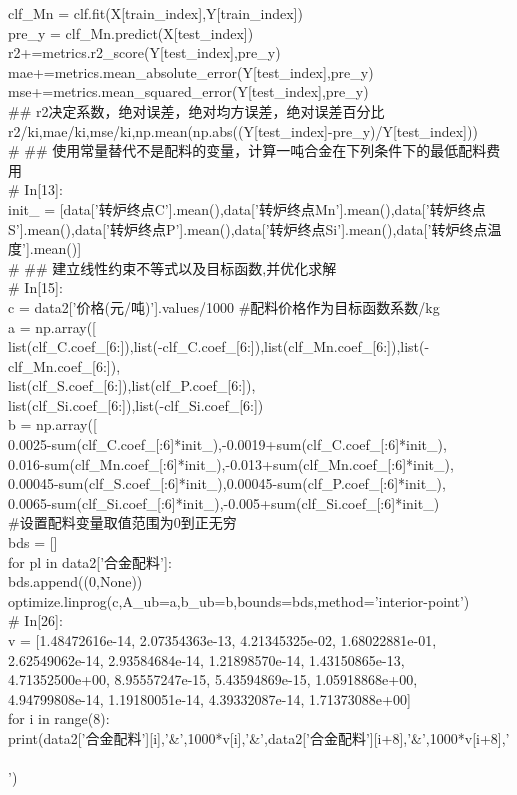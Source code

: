 \documentclass{xcumcmart}
\begin{document}
clf\_Mn = clf.fit(X[train\_index],Y[train\_index]) \\
pre\_y = clf\_Mn.predict(X[test\_index]) \\
r2+=metrics.r2\_score(Y[test\_index],pre\_y) \\
mae+=metrics.mean\_absolute\_error(Y[test\_index],pre\_y) \\
mse+=metrics.mean\_squared\_error(Y[test\_index],pre\_y) \\
\#\# r2决定系数，绝对误差，绝对均方误差，绝对误差百分比 \\
r2/ki,mae/ki,mse/ki,np.mean(np.abs((Y[test\_index]-pre\_y)/Y[test\_index])) \\
\# \#\# 使用常量替代不是配料的变量，计算一吨合金在下列条件下的最低配料费用 \\
\# In[13]: \\
init\_ = [data['转炉终点C'].mean(),data['转炉终点Mn'].mean(),data['转炉终点S'].mean(),data['转炉终点P'].mean(),data['转炉终点Si'].mean(),data['转炉终点温度'].mean()] \\
\# \#\# 建立线性约束不等式以及目标函数,并优化求解 \\
\# In[15]: \\
c = data2['价格(元/吨)'].values/1000 \#配料价格作为目标函数系数/kg \\
a = np.array([ \\
list(clf\_C.coef\_[6:]),list(-clf\_C.coef\_[6:]),list(clf\_Mn.coef\_[6:]),list(-clf\_Mn.coef\_[6:]), \\
list(clf\_S.coef\_[6:]),list(clf\_P.coef\_[6:]), \\
list(clf\_Si.coef\_[6:]),list(-clf\_Si.coef\_[6:]) \\
b = np.array([ \\
0.0025-sum(clf\_C.coef\_[:6]*init\_),-0.0019+sum(clf\_C.coef\_[:6]*init\_), \\
0.016-sum(clf\_Mn.coef\_[:6]*init\_),-0.013+sum(clf\_Mn.coef\_[:6]*init\_), \\
0.00045-sum(clf\_S.coef\_[:6]*init\_),0.00045-sum(clf\_P.coef\_[:6]*init\_), \\
0.0065-sum(clf\_Si.coef\_[:6]*init\_),-0.005+sum(clf\_Si.coef\_[:6]*init\_) \\
\#设置配料变量取值范围为0到正无穷 \\
bds = [] \\
for pl in data2['合金配料']: \\
bds.append((0,None)) \\
optimize.linprog(c,A\_ub=a,b\_ub=b,bounds=bds,method='interior-point') \\
\# In[26]: \\
v = [1.48472616e-14, 2.07354363e-13, 4.21345325e-02, 1.68022881e-01, \\
2.62549062e-14, 2.93584684e-14, 1.21898570e-14, 1.43150865e-13, \\
4.71352500e+00, 8.95557247e-15, 5.43594869e-15, 1.05918868e+00, \\
4.94799808e-14, 1.19180051e-14, 4.39332087e-14, 1.71373088e+00] \\
for i in range(8): \\
print(data2['合金配料'][i],'\&',1000*v[i],'\&',data2['合金配料'][i+8],'\&',1000*v[i+8],'\\\\') \\
\end{document}
